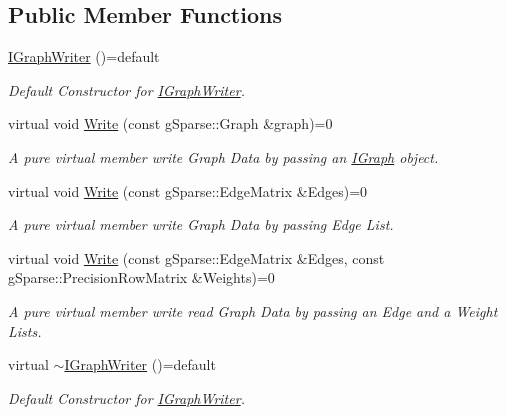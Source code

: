 \subsection*{Public Member Functions}
\begin{DoxyCompactItemize}
\item 
\mbox{\label{classg_sparse_1_1_i_graph_writer_a05a22eb501d282bc3617e034ac6ce2af}} 
\mbox{\hyperlink{classg_sparse_1_1_i_graph_writer_a05a22eb501d282bc3617e034ac6ce2af}{I\+Graph\+Writer}} ()=default
\begin{DoxyCompactList}\small\item\em Default Constructor for \mbox{\hyperlink{classg_sparse_1_1_i_graph_writer}{I\+Graph\+Writer}}. \end{DoxyCompactList}\item 
virtual void \mbox{\hyperlink{classg_sparse_1_1_i_graph_writer_a24a0956558888343c5e56a3c39b138af}{Write}} (const g\+Sparse\+::\+Graph \&graph)=0
\begin{DoxyCompactList}\small\item\em A pure virtual member write Graph Data by passing an \mbox{\hyperlink{classg_sparse_1_1_i_graph}{I\+Graph}} object. \end{DoxyCompactList}\item 
virtual void \mbox{\hyperlink{classg_sparse_1_1_i_graph_writer_aa778df52e1595439d724fc873a8dfb52}{Write}} (const g\+Sparse\+::\+Edge\+Matrix \&Edges)=0
\begin{DoxyCompactList}\small\item\em A pure virtual member write Graph Data by passing Edge List. \end{DoxyCompactList}\item 
virtual void \mbox{\hyperlink{classg_sparse_1_1_i_graph_writer_ae2c720f3e37629da40fdc5d0e4fe2dd2}{Write}} (const g\+Sparse\+::\+Edge\+Matrix \&Edges, const g\+Sparse\+::\+Precision\+Row\+Matrix \&Weights)=0
\begin{DoxyCompactList}\small\item\em A pure virtual member write read Graph Data by passing an Edge and a Weight Lists. \end{DoxyCompactList}\item 
\mbox{\label{classg_sparse_1_1_i_graph_writer_a7c29459ba96e82fec35b1a71a8d79e05}} 
virtual \mbox{\hyperlink{classg_sparse_1_1_i_graph_writer_a7c29459ba96e82fec35b1a71a8d79e05}{$\sim$\+I\+Graph\+Writer}} ()=default
\begin{DoxyCompactList}\small\item\em Default Constructor for \mbox{\hyperlink{classg_sparse_1_1_i_graph_writer}{I\+Graph\+Writer}}. \end{DoxyCompactList}\end{DoxyCompactItemize}


